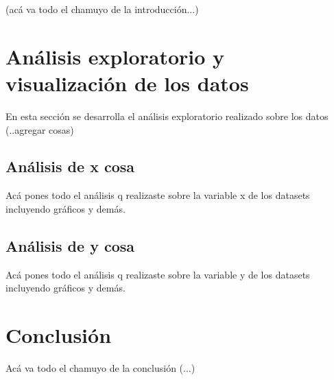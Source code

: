 \documentclass[titlepage,a4paper]{article}
\begin{document}
(acá va todo el chamuyo de la introducción...)

\newpage

\section{Análisis exploratorio y visualización de los datos}\label{sec:intro}

En esta sección se desarrolla el análisis exploratorio realizado sobre los datos (..agregar cosas)

\newpage  %

\subsection{Análisis de x cosa}

Acá pones todo el análisis q realizaste sobre la variable x de los datasets incluyendo gráficos y demás.

\newpage 

\subsection{Análisis de y cosa}

Acá pones todo el análisis q realizaste sobre la variable y de los datasets incluyendo gráficos y demás.

\newpage  %

\section{Conclusión}\label{sec:intro}

Acá va todo el chamuyo de la conclusión (...)
\end{document}
